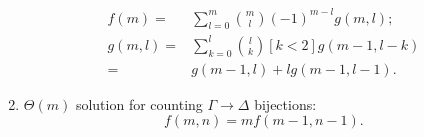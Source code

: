 \documentclass{article}
\theoremstyle{definition}
\begin{document}
\begin{enumerate}
  \begin{align*}
    f(m) ={}& \sum_{l=0}^{m} \binom{m}{l} {(-1)}^{m-l} g(m, l); \\
    g(m, l) ={}& \sum_{k=0}^{l} \binom{l}{k} [k < 2] g(m - 1, l - k)\\
    ={}& g(m - 1, l) + lg(m - 1, l - 1).
  \end{align*}
  \item $\Theta(m)$ solution for counting $\Gamma \to \Delta$ bijections:
  \[
    f(m, n) = mf(m-1, n-1).
  \]
\end{enumerate}



\end{document}
